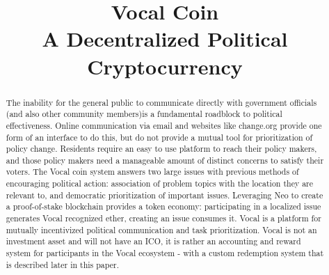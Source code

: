 \documentclass[conference]{IEEEtran}
\begin{document}
    \title{Vocal Coin\\ A Decentralized Political Cryptocurrency }
    
    \author{
        \and
    }

    \maketitle
    
    \begin{abstract}
      The inability for the general public to communicate directly with government officials (and also other community members)is a fundamental roadblock to political effectiveness. Online communication via email and websites like change.org provide one form of an interface to do this, but do not provide a mutual tool for prioritization of policy change. Residents require an easy to use platform to reach their policy makers, and those policy makers need a manageable amount of distinct concerns to satisfy their voters. The Vocal coin system answers two large issues with previous methods of encouraging political action: association of problem topics with the location they are relevant to, and democratic prioritization of important issues. Leveraging Neo to create a proof-of-stake blockchain provides a token economy: participating in a localized issue generates Vocal recognized ether, creating an issue consumes it. Vocal is a platform for mutually incentivized political communication and task prioritization. Vocal is not an investment asset and will not have an ICO, it is rather an accounting and reward system for participants in the Vocal ecosystem - with a custom redemption system that is described later in this paper.
    

    \end{abstract}
\end{document}
